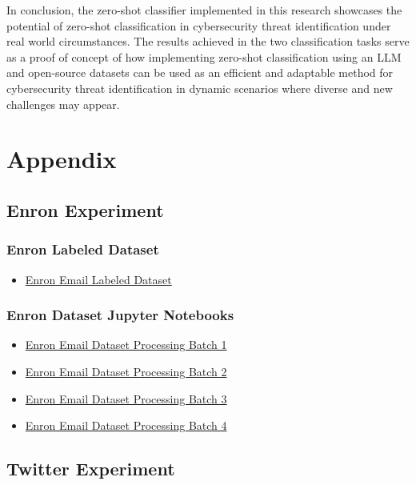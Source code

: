 \documentclass[letterpaper,twocolumn,fleqn]{article}
\begin{document}
In conclusion, the zero-shot classifier implemented in this research showcases the potential of zero-shot classification in cybersecurity threat identification under real world circumstances. The results achieved in the two classification tasks serve as a proof of concept of how implementing zero-shot classification using an LLM and open-source datasets can be used as an efficient and adaptable method for cybersecurity threat identification in dynamic scenarios where diverse and new challenges may appear.


\appendix
\section{Appendix}

\subsection{Enron Experiment}
\subsubsection{Enron Labeled Dataset}
\begin{itemize}
  \item \href{https://github.com/MWiechmann/enron_spam_data}{Enron Email Labeled Dataset}
\end{itemize}
\subsubsection{Enron Dataset Jupyter Notebooks}
\begin{itemize}
  \item \href{https://colab.research.google.com/drive/1XL6HxcqCgSeBpjBns8kCpp1qzrpnC4o5?usp=sharing}{Enron Email Dataset Processing Batch 1}
  \item \href{https://colab.research.google.com/drive/13jZMi0vlYfhMoJilG7f_2y-g0SwO3ood?usp=sharing}{Enron Email Dataset Processing Batch 2}
  \item \href{https://colab.research.google.com/drive/1Uv7xBBqldGZIh9R3H4A3S0GSjbjELZrt?usp=sharing}{Enron Email Dataset Processing Batch 3}
  \item \href{https://colab.research.google.com/drive/1xUwfLDlx5JAZ6lGt1nFKmlBWczD0cFsI?usp=sharing}{Enron Email Dataset Processing Batch 4}
\end{itemize}

\subsection{Twitter Experiment}
\end{document}
